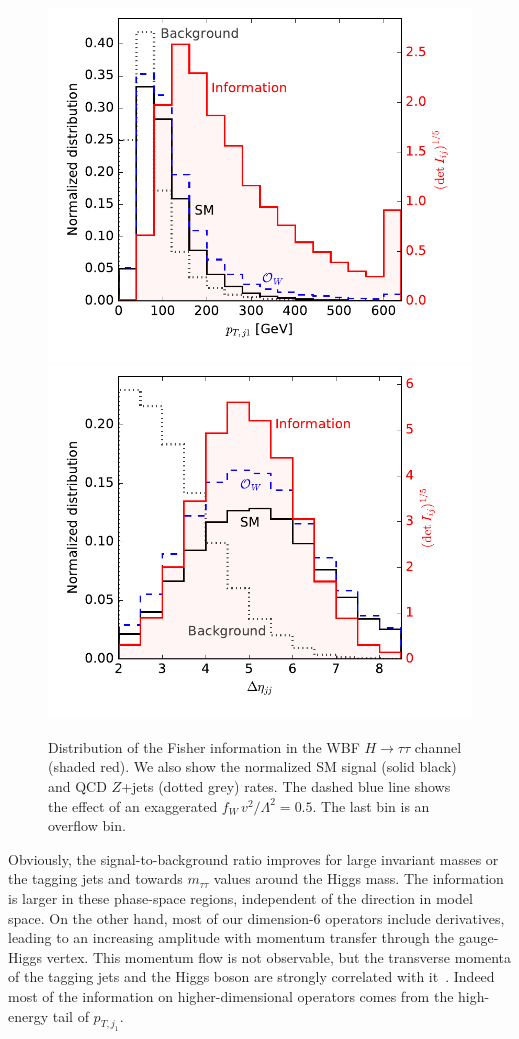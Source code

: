 \begin{figure}
  \includegraphics[height=0.45 \textwidth]{fig/information/wbf_tautau_information_over_ptj}%
  \includegraphics[height=0.45 \textwidth]{fig/information/wbf_tautau_information_over_deltaeta}%
  \caption{Distribution of the Fisher information in the WBF $H \to
    \tau \tau$ channel (shaded red). We also show the normalized SM signal
    (solid black) and QCD $Z$+jets (dotted grey) rates. The dashed blue line
    shows the effect of an exaggerated $f_{W} \, v^2 / \Lambda^2 =
    0.5$. The last bin is an overflow bin.
    }
  \label{fig:information_wbf_tautau_differential_information}
\end{figure}


Obviously, the signal-to-background ratio improves for large invariant
masses or the tagging jets and towards $m_{\tau \tau}$ values around
the Higgs mass. The information is larger in these phase-space
regions, independent of the direction in model space.  On the other
hand, most of our dimension-6 operators include derivatives, leading
to an increasing amplitude with momentum transfer through the
gauge-Higgs vertex. This momentum flow is not observable, but the
transverse momenta of the tagging jets and the Higgs boson are
strongly correlated with it~\cite{eft-edge}. Indeed most of the
information on higher-dimensional operators comes from the high-energy
tail of $p_{T,j_1}$.

